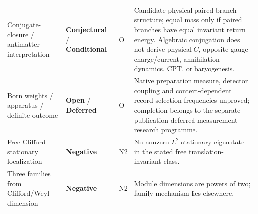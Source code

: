 \documentclass[11pt]{article}
\theoremstyle{definition}
\newcommand{\statusConditional}{\textcolor{yellow!60!black}{\textbf{Conditional}}}
\newcommand{\statusNegative}{\textcolor{red!65!black}{\textbf{Negative}}}
\newcommand{\statusConjectural}{\textcolor{magenta!65!black}{\textbf{Conjectural}}}
\newcommand{\statusDeferred}{\textcolor{gray!70!black}{\textbf{Deferred}}}
\newcommand{\statusOpen}{\textcolor{red!75!black}{\textbf{Open}}}
\begin{document}
\begin{longtable}{P{3.7cm}P{2.7cm}P{1.45cm}P{6.6cm}}
Conjugate-closure / antimatter interpretation & \statusConjectural{} / \statusConditional{} & O & Candidate physical paired-branch structure; equal mass only if paired branches have equal invariant return energy. Algebraic conjugation does not derive physical $C$, opposite gauge charge/current, annihilation dynamics, CPT, or baryogenesis.\\
Born weights / apparatus / definite outcome & \statusOpen{} / \statusDeferred{} & O & Native preparation measure, detector coupling and context-dependent record-selection frequencies unproved; completion belongs to the separate publication-deferred measurement research programme.\\
Free Clifford stationary localization & \statusNegative{} & N2 & No nonzero $L^2$ stationary eigenstate in the stated free translation-invariant class.\\
Three families from Clifford/Weyl dimension & \statusNegative{} & N2 & Module dimensions are powers of two; family mechanism lies elsewhere.\\
\bottomrule
\end{longtable}
\endgroup

\newpage

\printbibliography[title={References}]
\end{document}
